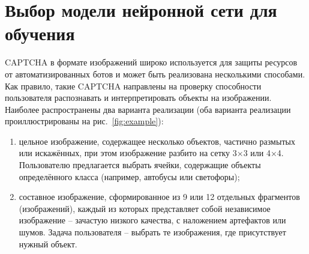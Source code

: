 \chapter{Выбор модели нейронной сети для обучения}

CAPTCHA в формате изображений широко используется для защиты ресурсов от автоматизированных ботов и может быть реализована несколькими способами. Как правило, такие CAPTCHA направлены на проверку способности пользователя распознавать и интерпретировать объекты на изображении. Наиболее распространены два варианта реализации (оба варианта реализации проиллюстрированы на рис.~\ref{fig:example}):

\begin{enumerate}
    \item цельное изображение, содержащее несколько объектов, частично размытых или искажённых, при этом изображение разбито на сетку 3×3 или 4×4. Пользователю предлагается выбрать ячейки, содержащие объекты определённого класса (например, автобусы или светофоры);
    \item составное изображение, сформированное из 9 или 12 отдельных фрагментов (изображений), каждый из которых представляет собой независимое изображение -- зачастую низкого качества, с наложением артефактов или шумов. Задача пользователя -- выбрать те изображения, где присутствует нужный объект.
\end{enumerate}

